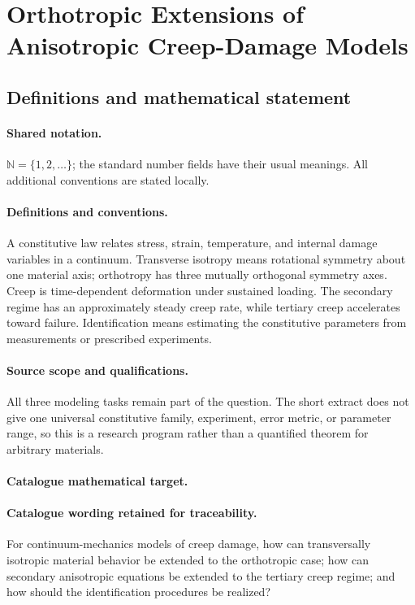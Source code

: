 \documentclass[11pt]{article}
\begin{document}
\section{Orthotropic Extensions of Anisotropic Creep-Damage Models}\label{statement}

\subsection{Definitions and mathematical statement}

\paragraph{Shared notation.}$\mathbb N=\{1,2,\ldots\}$; the standard number fields have their usual meanings. All additional conventions are stated locally.


\paragraph{Definitions and conventions.} A constitutive law relates stress, strain, temperature, and internal damage variables in a continuum. Transverse isotropy means rotational symmetry about one material axis; orthotropy has three mutually orthogonal symmetry axes. Creep is time-dependent deformation under sustained loading. The secondary regime has an approximately steady creep rate, while tertiary creep accelerates toward failure. Identification means estimating the constitutive parameters from measurements or prescribed experiments.

\paragraph{Source scope and qualifications.} All three modeling tasks remain part of the question. The short extract does not give one universal constitutive family, experiment, error metric, or parameter range, so this is a research program rather than a quantified theorem for arbitrary materials.

\paragraph{Catalogue mathematical target.}
\paragraph{Catalogue wording retained for traceability.}
For continuum-mechanics models of creep damage, how can transversally isotropic material behavior be extended to the orthotropic case; how can secondary anisotropic equations be extended to the tertiary creep regime; and how should the identification procedures be realized?
\end{document}
